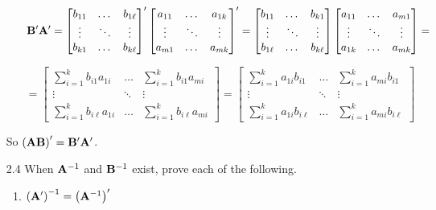 \begin{enumerate}[font=\bfseries]
\begin{enumerate}
            \[
                \bold{B}^\prime \bold{A}^\prime = 
                \begin{bmatrix}
                    b_{11} & \dots & b_{1\ell} \\
                    \vdots & \ddots & \vdots \\
                    b_{k1} & \dots & b_{k\ell}
                \end{bmatrix}^\prime
                \begin{bmatrix}
                    a_{11} & \dots & a_{1k} \\
                    \vdots & \ddots & \vdots \\
                    a_{m1} & \dots & a_{mk}
                \end{bmatrix}^\prime =
                \begin{bmatrix}
                    b_{11} & \dots & b_{k1} \\
                    \vdots & \ddots & \vdots \\
                    b_{1\ell} & \dots & b_{k\ell}
                \end{bmatrix}
                \begin{bmatrix}
                    a_{11} & \dots & a_{m1} \\
                    \vdots & \ddots & \vdots \\
                    a_{1k} & \dots & a_{mk}
                \end{bmatrix} =
            \]

            \[
                = \begin{bmatrix}
                    \sum_{i=1}^k{b_{i1}a_{1i}} & \dots & \sum_{i=1}^k{b_{i1}a_{mi}} \\
                    \vdots & \ddots & \vdots \\
                    \sum_{i=1}^k{b_{i\ell}a_{1i}} & \dots & \sum_{i=1}^k{b_{i\ell}a_{mi}}
                \end{bmatrix} = \begin{bmatrix}
                    \sum_{i=1}^k{a_{1i}b_{i1}} & \dots & \sum_{i=1}^k{a_{mi}b_{i1}} \\
                    \vdots & \ddots & \vdots \\
                    \sum_{i=1}^k{a_{1i}b_{i\ell}} & \dots & \sum_{i=1}^k{a_{mi}b_{i\ell}}
                \end{bmatrix}
            \]
        \end{enumerate}
        So ${\left(\bold{AB}\right)}^\prime = \bold{B}^\prime\bold{A}^\prime$.
        \item[2.4] When $\bold{A}^{-1}$ and $\bold{B}^{-1}$ exist, prove each of the following.
        \begin{enumerate}
            \item ${\left(\bold{A}^\prime\right)}^{-1} = {\left(\bold{A}^{-1}\right)}^\prime$
            

\end{enumerate}
\end{enumerate}
